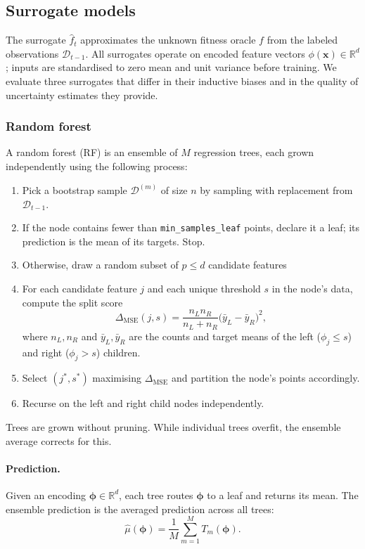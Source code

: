 \subsection{Surrogate models}

The surrogate $\hat{f}_t$ approximates the unknown fitness oracle $f$ from the labeled observations $\mathcal{D}_{t-1}$. All surrogates operate on encoded feature vectors $\phi(\mathbf{x}) \in \mathbb{R}^d$; inputs are standardised to zero mean and unit variance before training. We evaluate three surrogates that differ in their inductive biases and in the quality of uncertainty estimates they provide.

\subsubsection{Random forest}

A random forest (RF)  is an ensemble of $M$ regression trees, each grown independently using the following process:
\begin{enumerate}
  \item Pick a bootstrap sample $\mathcal{D}^{(m)}$ of size $n$ by sampling with replacement from $\mathcal{D}_{t-1}$.
  \item If the node contains fewer than \texttt{min\_samples\_leaf} points, declare it a leaf; its prediction is the mean of its targets. Stop.
  \item Otherwise, draw a random subset of $p \leq d$ candidate features 
  \item For each candidate feature $j$ and each unique threshold $s$ in the node's data, compute the split score
    \begin{equation}
      \Delta_\text{MSE}(j, s) = \frac{n_L n_R}{n_L + n_R}\bigl(\bar{y}_L - \bar{y}_R\bigr)^2,
    \end{equation}
    where $n_L, n_R$ and $\bar{y}_L, \bar{y}_R$ are the counts and target means of the left ($\phi_j \leq s$) and right ($\phi_j > s$) children.
  \item Select $(j^*, s^*)$ maximising $\Delta_\text{MSE}$ and partition the node's points accordingly.
  \item Recurse on the left and right child nodes independently.
\end{enumerate}
Trees are grown without pruning. While individual trees overfit, the ensemble average corrects for this.

\paragraph{Prediction.}
Given an encoding $\boldsymbol{\phi} \in \mathbb{R}^d$, each tree routes $\boldsymbol{\phi}$ to a leaf and returns its mean.
The ensemble prediction is the averaged prediction across all trees:
\begin{equation}
  \hat{\mu}(\boldsymbol{\phi}) = \frac{1}{M}\sum_{m=1}^{M} T_m(\boldsymbol{\phi}).
\end{equation}

